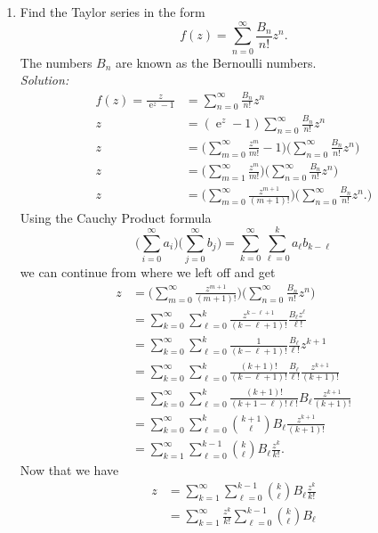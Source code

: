 \documentclass[10pt]{amsart}
\DeclareMathOperator{\E}{e}
\theoremstyle{nonumberplain}
\begin{document}
\begin{enumerate}[label={\bf {\arabic*}:}]
\begin{enumerate}
\item Find the Taylor series in the form
$$
f(z)=\sum_{n=0}^{\infty} \frac{B_n}{n!} z^n .
$$
The numbers $B_n$ are known as the Bernoulli numbers. \\

\noindent
\textit{Solution:} \\
\begin{align*}
f(z) = \frac {z}{\E^z - 1} &= \sum_{n=0}^{\infty} \frac{B_n}{n!} z^n \\
	z &= (\E^z - 1)\sum_{n=0}^{\infty} \frac{B_n}{n!} z^n \\
	z &= \bigg( \sum_{m=0}^\infty \frac {z^m}{m!} - 1\bigg) \bigg( \sum_{n=0}^{\infty} \frac{B_n}{n!} z^n \bigg) \\
	z &= \bigg( \sum_{m=1}^\infty \frac {z^m}{m!}\bigg) \bigg(\sum_{n=0}^{\infty} \frac{B_n}{n!} z^n \bigg) \\
	z &= \bigg( \sum_{m=0}^\infty \frac {z^{m+1}}{(m+1)!}\bigg) \bigg(\sum_{n=0}^{\infty} \frac{B_n}{n!} z^n. \bigg)
\end{align*}
Using the Cauchy Product formula
$$
\bigg( \sum_{i=0}^{\infty} a_i \bigg) \bigg(\sum_{j=0}^{\infty} b_j \bigg) = \sum_{k=0}^\infty \sum_{\ell=0}^k a_\ell b_{k - \ell}
$$
we can continue from where we left off and get
\begin{align*}
z &= \bigg( \sum_{m=0}^\infty \frac {z^{m+1}}{(m+1)!}\bigg) \bigg(\sum_{n=0}^{\infty} \frac{B_n}{n!} z^n\bigg) \\
	&= \sum_{k=0}^\infty \sum_{\ell=0}^k \frac {z^{k - \ell+1}}{(k - \ell+1)!} \frac{B_{\ell} z^\ell}{\ell!} \\
	&= \sum_{k=0}^\infty \sum_{\ell=0}^k \frac 1{(k - \ell+1)!} \frac{B_{\ell}}{\ell!} z^{k+1} \\
	&= \sum_{k=0}^\infty \sum_{\ell=0}^k \frac {(k + 1)!}{(k - \ell+1)!} \frac{B_{\ell}}{\ell!} \frac{z^{k+1}}{(k + 1)!} \\
	&= \sum_{k=0}^\infty \sum_{\ell=0}^k \frac {(k + 1)!}{(k + 1 - \ell)!\ell!} B_{\ell} \frac{z^{k+1}}{(k + 1)!} \\
	&= \sum_{k=0}^\infty \sum_{\ell=0}^k {k + 1 \choose \ell} B_{\ell} \frac{z^{k+1}}{(k + 1)!} \\
	&= \sum_{k=1}^\infty \sum_{\ell=0}^{k-1} {k \choose \ell} B_{\ell} \frac{z^{k}}{k!}.
\end{align*}
Now that we have
\begin{align*}
z &= \sum_{k=1}^\infty \sum_{\ell=0}^{k-1} {k \choose \ell} B_{\ell} \frac{z^{k}}{k!} \\
	&= \sum_{k=1}^\infty \frac{z^{k}}{k!} \sum_{\ell=0}^{k-1} {k \choose \ell} B_{\ell}

\end{align*}
\end{enumerate}
\end{enumerate}
\end{document}
